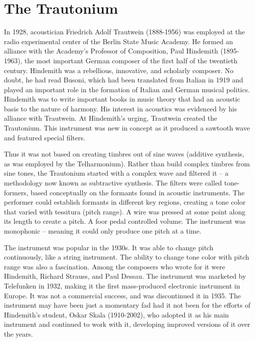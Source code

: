 \section{The Trautonium}

In 1928, acoustician Friedrich Adolf Trautwein (1888-1956) was employed at the radio experimental center of the Berlin State Music Academy. He formed an alliance with the Academy's Professor of Composition, Paul Hindemith (1895-1963), the most important German composer of the first half of the twentieth century. Hindemith was a rebellious, innovative, and scholarly composer. No doubt, he had read Busoni, which had been translated from Italian in 1919 and played an important role in the formation of Italian and German musical politics. Hindemith was to write important books in music theory that had an acoustic basis to the nature of harmony. His interest in acoustics was evidenced by his alliance with Trautwein. At Hindemith's urging, Trautwein created the Trautonium. This instrument was new in concept as it produced a sawtooth wave and featured special filters.

Thus it was not based on creating timbres out of sine waves (additive synthesis, as was employed by the Telharmonium). Rather than build complex timbres from sine tones, the Trautonium started with a complex wave and filtered it -- a methodology now known as subtractive synthesis. The filters were called tone-formers, based conceptually on the formants found in acoustic instruments. The performer could establish formants in different key regions, creating a tone color that varied with tessitura (pitch range). A wire was pressed at some point along its length to create a pitch. A foor pedal controlled volume. The instrument was monophonic -- meaning it could only produce one pitch at a time.

The instrument was popular in the 1930s. It was able to change pitch continuously, like a string instrument. The ability to change tone color with pitch range was also a fascination. Among the composers who wrote for it were Hindemith, Richard Strauss, and Paul Dessau. The instrument was marketed by Telefunken in 1932, making it the first mass-produced electronic instrument in Europe. It was not a commercial success, and was discontinued it in 1935. The instrument may have been just a momentary fad had it not been for the efforts of Hindemith's student, Oskar Skala (1910-2002), who adopted it as his main instrument and continued to work with it, developing improved versions of it over the years.

